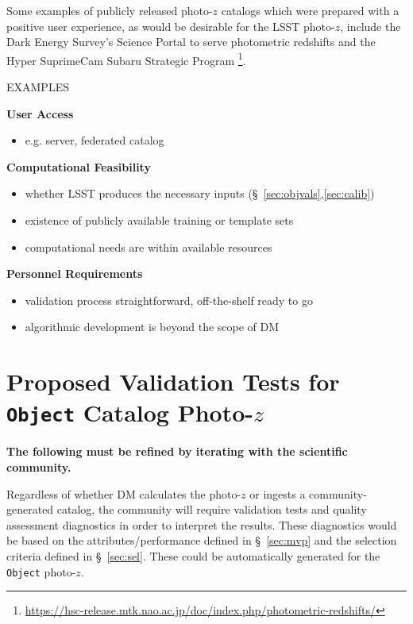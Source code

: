 \documentclass[DM,lsstdraft,toc]{lsstdoc}
\begin{document}
Some examples of publicly released photo-$z$ catalogs which were prepared with a positive user experience, as would be desirable for the LSST photo-$z$, include the Dark Energy Survey's Science Portal to serve photometric redshifts \cite{2018A&C....25...58G} and the Hyper SuprimeCam Subaru Strategic Program \cite{2018PASJ...70S...9T}\footnote{\url{https://hsc-release.mtk.nao.ac.jp/doc/index.php/photometric-redshifts/}}.

EXAMPLES

{\bf User Access}\\
\begin{itemize}
\item e.g. server, federated catalog
\end{itemize}

{\bf Computational Feasibility}\\
\begin{itemize}
\item whether LSST produces the necessary inputs (\S~\ref{sec:objvals},\ref{sec:calib})
\item existence of publicly available training or template sets
\item computational needs are within available resources
\end{itemize}

{\bf Personnel Requirements}\\
\begin{itemize}
\item validation process straightforward, off-the-shelf ready to go
\item algorithmic development is beyond the scope of DM
\end{itemize}





\clearpage
\section{Proposed Validation Tests for {\tt Object} Catalog Photo-$z$} \label{sec:validation}

{\bf The following must be refined by iterating with the scientific community.}

Regardless of whether DM calculates the photo-$z$ or ingests a community-generated catalog, the community will require validation tests and quality assessment diagnostics in order to interpret the results.
These diagnostics would be based on the attributes/performance defined in \S~\ref{sec:mvp} and the selection criteria defined in \S~\ref{sec:sel}. 
These could be automatically generated for the {\tt Object} photo-$z$.
\end{document}
